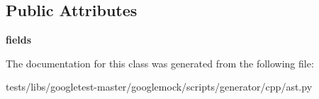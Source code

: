 \subsection*{Public Attributes}
\begin{DoxyCompactItemize}
\item 
\mbox{\label{classtests_1_1libs_1_1googletest-master_1_1googlemock_1_1scripts_1_1generator_1_1cpp_1_1ast_1_1__NestedType_a831300b4ca939cf9b7d806f1f4bf98a4}} 
{\bfseries fields}
\end{DoxyCompactItemize}


The documentation for this class was generated from the following file\+:\begin{DoxyCompactItemize}
\item 
tests/libs/googletest-\/master/googlemock/scripts/generator/cpp/ast.\+py\end{DoxyCompactItemize}
